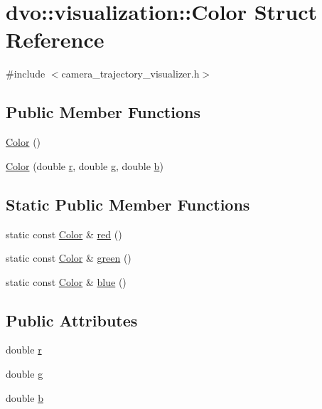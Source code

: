 \hypertarget{structdvo_1_1visualization_1_1_color}{}\section{dvo\+:\+:visualization\+:\+:Color Struct Reference}
\label{structdvo_1_1visualization_1_1_color}


{\ttfamily \#include $<$camera\+\_\+trajectory\+\_\+visualizer.\+h$>$}

\subsection*{Public Member Functions}
\begin{DoxyCompactItemize}
\item 
\mbox{\hyperlink{structdvo_1_1visualization_1_1_color_a512f756a2cca890e6157d655691b7282}{Color}} ()
\item 
\mbox{\hyperlink{structdvo_1_1visualization_1_1_color_ae045be10ad75fe12f0962ed5f36f458e}{Color}} (double \mbox{\hyperlink{structdvo_1_1visualization_1_1_color_a6941dd0d782ff4ecb73e0b4b0ac90f34}{r}}, double \mbox{\hyperlink{structdvo_1_1visualization_1_1_color_a683bddf0b9bd3d6d8a229a25a68d20b0}{g}}, double \mbox{\hyperlink{structdvo_1_1visualization_1_1_color_af48f0b94f4bd5e44fba8f039e8b9147d}{b}})
\end{DoxyCompactItemize}
\subsection*{Static Public Member Functions}
\begin{DoxyCompactItemize}
\item 
static const \mbox{\hyperlink{structdvo_1_1visualization_1_1_color}{Color}} \& \mbox{\hyperlink{structdvo_1_1visualization_1_1_color_afe1b33e3675419d460c9826073e45b23}{red}} ()
\item 
static const \mbox{\hyperlink{structdvo_1_1visualization_1_1_color}{Color}} \& \mbox{\hyperlink{structdvo_1_1visualization_1_1_color_a9a4cea43a6ad4ac6aef4dfe17ef6acd5}{green}} ()
\item 
static const \mbox{\hyperlink{structdvo_1_1visualization_1_1_color}{Color}} \& \mbox{\hyperlink{structdvo_1_1visualization_1_1_color_a82e356c5191e2f73ca16f1ae96abca30}{blue}} ()
\end{DoxyCompactItemize}
\subsection*{Public Attributes}
\begin{DoxyCompactItemize}
\item 
double \mbox{\hyperlink{structdvo_1_1visualization_1_1_color_a6941dd0d782ff4ecb73e0b4b0ac90f34}{r}}
\item 
double \mbox{\hyperlink{structdvo_1_1visualization_1_1_color_a683bddf0b9bd3d6d8a229a25a68d20b0}{g}}
\item 
double \mbox{\hyperlink{structdvo_1_1visualization_1_1_color_af48f0b94f4bd5e44fba8f039e8b9147d}{b}}
\end{DoxyCompactItemize}


